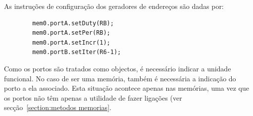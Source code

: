 







As instruções de configuração dos geradores de endereços são dadas por:

\begin{lstlisting}
		mem0.portA.setDuty(RB);
		mem0.portA.setPer(RB);
		mem0.portA.setIncr(1);
		mem0.portB.setIter(R6-1);
\end{lstlisting}

Como os portos são tratados como objectos, é necessário indicar a unidade funcional. No caso de ser uma memória, também é necessária
a indicação do porto a ela associado.
Esta situação acontece apenas nas memórias, uma vez que os portos não têm apenas a utilidade de fazer ligações (ver secção~\ref{section:metodos memorias}.



